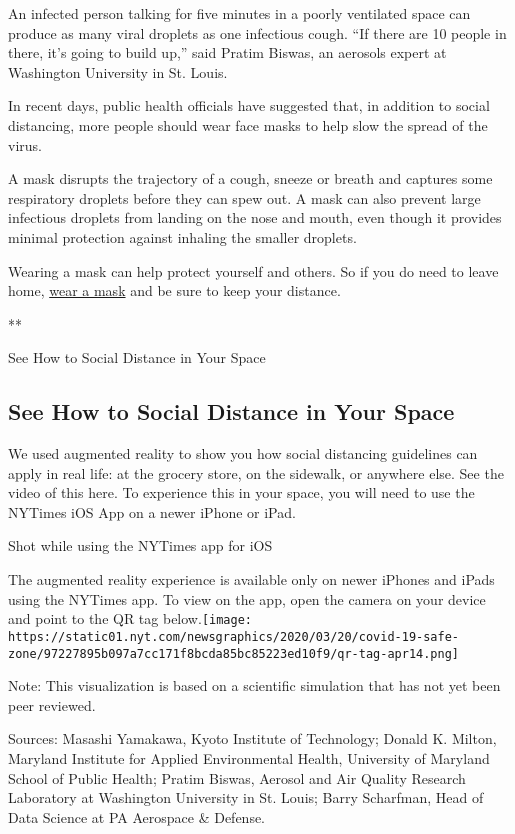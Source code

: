An infected person talking for five minutes in a poorly ventilated space
can produce as many viral droplets as one infectious cough. ``If there
are 10 people in there, it's going to build up,'' said Pratim Biswas, an
aerosols expert at Washington University in St. Louis.

In recent days, public health officials have suggested that, in addition
to social distancing, more people should wear face masks to help slow
the spread of the virus.

A mask disrupts the trajectory of a cough, sneeze or breath and captures
some respiratory droplets before they can spew out. A mask can also
prevent large infectious droplets from landing on the nose and mouth,
even though it provides minimal protection against inhaling the smaller
droplets.

Wearing a mask can help protect yourself and others. So if you do need
to leave home,
\href{https://www.nytimes.com/2020/04/10/well/live/coronavirus-face-masks-guides-protection-personal-protective-equipment.html}{wear
a mask} and be sure to keep your distance.

**

See How to Social Distance in Your Space

\hypertarget{see-how-to-social-distance-in-your-space}{%
\subsection{See How to Social Distance in Your
Space}\label{see-how-to-social-distance-in-your-space}}

We used augmented reality to show you how social distancing guidelines
can apply in real life: at the grocery store, on the sidewalk, or
anywhere else. See the video of this here. To experience this in your
space, you will need to use the NYTimes iOS App on a newer iPhone or
iPad.

Shot while using the NYTimes app for iOS

The augmented reality experience is available only on newer iPhones and
iPads using the NYTimes app. To view on the app, open the camera on your
device and point to the QR tag
below.\texttt{[image: https://static01.nyt.com/newsgraphics/2020/03/20/covid-19-safe-zone/97227895b097a7cc171f8bcda85bc85223ed10f9/qr-tag-apr14.png]}

Note: This visualization is based on a scientific simulation that has
not yet been peer reviewed.

Sources: Masashi Yamakawa, Kyoto Institute of Technology; Donald K.
Milton, Maryland Institute for Applied Environmental Health, University
of Maryland School of Public Health; Pratim Biswas, Aerosol and Air
Quality Research Laboratory at Washington University in St. Louis; Barry
Scharfman, Head of Data Science at PA Aerospace \& Defense.

